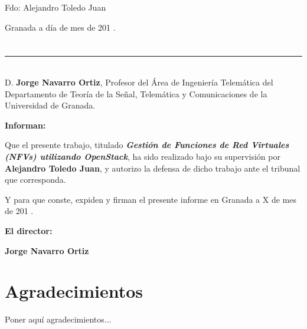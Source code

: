 \vspace{6cm}

\noindent Fdo: Alejandro Toledo Juan

\vspace{2cm}

\begin{flushright}
Granada a día de mes de 201 .
\end{flushright}


\chapter*{}
\thispagestyle{empty}

\noindent\rule[-1ex]{\textwidth}{2pt}\\[4.5ex]

D. \textbf{Jorge Navarro Ortiz}, Profesor del Área de Ingeniería Telemática del Departamento de Teoría de la Señal, Telemática y Comunicaciones de la Universidad de Granada.

\vspace{0.5cm}


\vspace{0.5cm}

\textbf{Informan:}

\vspace{0.5cm}

Que el presente trabajo, titulado \textit{\textbf{ Gestión de Funciones de Red Virtuales (NFVs) utilizando OpenStack}}, ha sido realizado bajo su supervisión por \textbf{Alejandro Toledo Juan}, y autorizo la defensa de dicho trabajo ante el tribunal que corresponda.

\vspace{0.5cm}

Y para que conste, expiden y firman el presente informe en Granada a X de mes de 201 .

\vspace{1cm}

\textbf{El director:}

\vspace{5cm}

\noindent \textbf{Jorge Navarro Ortiz \ \ \ \ \ }

\chapter*{Agradecimientos}
\thispagestyle{empty}

       \vspace{1cm}


Poner aquí agradecimientos...

